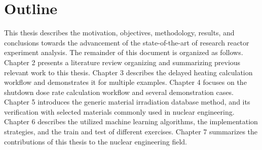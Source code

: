 \section{Outline}

This thesis describes the motivation, objectives, methodology, results, and conclusions towards the advancement of the state-of-the-art of research reactor experiment analysis.
The remainder of this document is organized as follows.
Chapter 2 presents a literature review organizing and summarizing previous relevant work to this thesis.
Chapter 3 describes the delayed heating calculation workflow and demonstrates it for  multiple examples.
Chapter 4 focuses on the shutdown dose rate calculation workflow and several demonstration cases.
Chapter 5 introduces the generic material irradiation database method, and its verification with selected materials commonly used in nuclear engineering.
Chapter 6 describes the utilized machine learning algorithms, the implementation strategies, and the train and test of different exercises.
Chapter 7 summarizes the contributions of this thesis to the nuclear engineering field.


